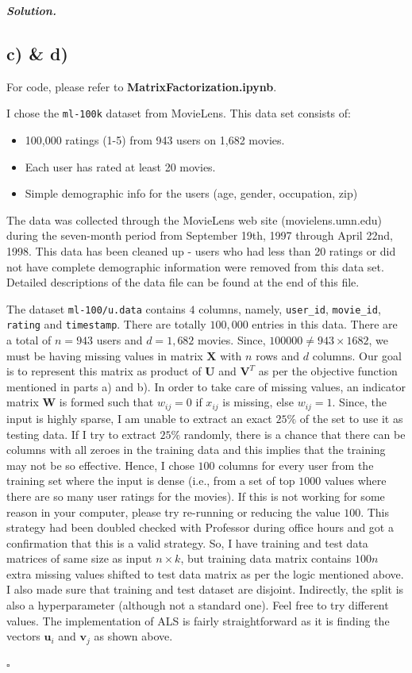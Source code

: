 \documentclass[10pt]{article}
\newenvironment{solution}[1][\it{Solution}]{\textbf{#1. } }{$\square$}
\begin{document}
\begin{solution}
\subsection*{c) \&  d)}

For code, please refer to \textbf{MatrixFactorization.ipynb}.

I chose the \texttt{ml-100k} dataset\cite{movielens100} from MovieLens. This data set consists of:
\begin{itemize}
	\item 100,000 ratings (1-5) from 943 users on 1,682 movies. 
	\item Each user has rated at least 20 movies. 
	\item Simple demographic info for the users (age, gender, occupation, zip)
\end{itemize}

The data was collected through the MovieLens web site (movielens.umn.edu) during the seven-month period from September 19th, 1997 through April 22nd, 1998. This data has been cleaned up - users who had less than 20 ratings or did not have complete demographic information were removed from this data set. Detailed descriptions of the data file can be found at the end of this file.

The dataset \texttt{ml-100/u.data} contains $4$ columns, namely, \texttt{user\_id}, \texttt{movie\_id}, \texttt{rating} and \texttt{timestamp}. There are totally $100,000$ entries in this data. There are a total of $n = 943$ users and $d = 1,682$ movies. Since, $100000 \ne 943 \times 1682$, we must be having missing values in matrix $\textbf{X}$ with $n$ rows and $d$ columns. Our goal is to represent this matrix as product of $\textbf{U}$ and $\textbf{V}^{T}$ as per the objective function mentioned in parts a) and b). In order to take care of missing values, an indicator matrix $\textbf{W}$ is formed such that $w_{ij} = 0$ if $x_{ij}$ is missing, else $w_{ij} = 1$. Since, the input is highly sparse, I am unable to extract an exact $25 \%$ of the set to use it as testing data. If I try to extract $25 \%$ randomly, there is a chance that there can be columns with all zeroes in the training data and this implies that the training may not be so effective. Hence, I chose $100$ columns for every user from the training set where the input is dense (i.e., from a set of top $1000$ values where there are so many user ratings for the movies). If this is not working for some reason in your computer, please try re-running or reducing the value $100$. This strategy had been doubled checked with Professor during office hours and got a confirmation that this is a valid strategy. So, I have training and test data matrices of same size as input $n \times k$, but training data matrix contains $100n$ extra missing values shifted to test data matrix as per the logic mentioned above. I also made sure that training and test dataset are disjoint. Indirectly, the split is also a hyperparameter (although not a standard one). Feel free to try different values. The implementation of ALS is fairly straightforward as it is finding the vectors $\textbf{u}_i$ and $\textbf{v}_j$ as shown above.


\end{solution}
\end{document}
